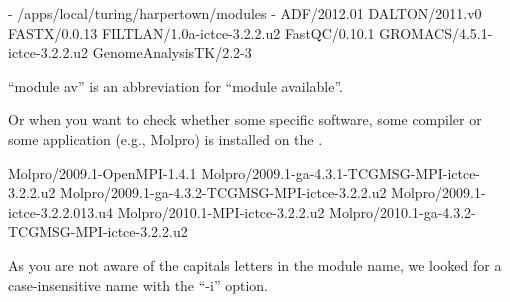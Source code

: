 \begin{prompt}
- /apps/local/turing/harpertown/modules -
ADF/2012.01
DALTON/2011.v0
FASTX/0.0.13
FILTLAN/1.0a-ictce-3.2.2.u2
FastQC/0.10.1
GROMACS/4.5.1-ictce-3.2.2.u2
GenomeAnalysisTK/2.2-3
\end{prompt}

``module av'' is an abbreviation for ``module available''.

Or when you want to check whether some specific software, some compiler or some
application (e.g., Molpro) is installed on the \hpc.

\begin{prompt}
Molpro/2009.1-OpenMPI-1.4.1
Molpro/2009.1-ga-4.3.1-TCGMSG-MPI-ictce-3.2.2.u2
Molpro/2009.1-ga-4.3.2-TCGMSG-MPI-ictce-3.2.2.u2
Molpro/2009.1-ictce-3.2.2.013.u4
Molpro/2010.1-MPI-ictce-3.2.2.u2
Molpro/2010.1-ga-4.3.2-TCGMSG-MPI-ictce-3.2.2.u2
\end{prompt}

As you are not aware of the capitals letters in the module name, we looked for
a case-insensitive name with the ``-i'' option.
